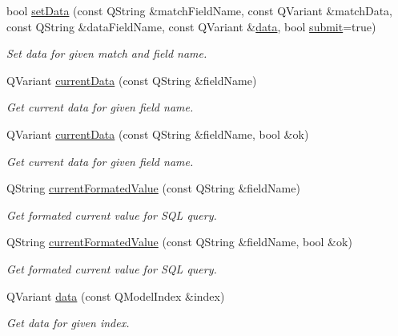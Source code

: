 \begin{DoxyCompactItemize}
bool \hyperlink{classmdt_abstract_sql_table_controller_a3e694e6dab9c883f1a276787a3723086}{set\-Data} (const Q\-String \&match\-Field\-Name, const Q\-Variant \&match\-Data, const Q\-String \&data\-Field\-Name, const Q\-Variant \&\hyperlink{classmdt_abstract_sql_table_controller_a1801a01c0ce073c2e389b20f58a3d3ff}{data}, bool \hyperlink{classmdt_abstract_sql_table_controller_a14f3e2a91fc30ca0e018944f4f95bc33}{submit}=true)
\begin{DoxyCompactList}\small\item\em Set data for given match and field name. \end{DoxyCompactList}\item 
Q\-Variant \hyperlink{classmdt_abstract_sql_table_controller_a055b69caef2670ea1ba6a5095167663f}{current\-Data} (const Q\-String \&field\-Name)
\begin{DoxyCompactList}\small\item\em Get current data for given field name. \end{DoxyCompactList}\item 
Q\-Variant \hyperlink{classmdt_abstract_sql_table_controller_a3477c9a155627cb08b660182a6ad6ff4}{current\-Data} (const Q\-String \&field\-Name, bool \&ok)
\begin{DoxyCompactList}\small\item\em Get current data for given field name. \end{DoxyCompactList}\item 
Q\-String \hyperlink{classmdt_abstract_sql_table_controller_a0af4c6d87f3d5b1ba7220c58e865dd1f}{current\-Formated\-Value} (const Q\-String \&field\-Name)
\begin{DoxyCompactList}\small\item\em Get formated current value for S\-Q\-L query. \end{DoxyCompactList}\item 
Q\-String \hyperlink{classmdt_abstract_sql_table_controller_a43311c27eab3a892fd079164abf3501f}{current\-Formated\-Value} (const Q\-String \&field\-Name, bool \&ok)
\begin{DoxyCompactList}\small\item\em Get formated current value for S\-Q\-L query. \end{DoxyCompactList}\item 
Q\-Variant \hyperlink{classmdt_abstract_sql_table_controller_a1801a01c0ce073c2e389b20f58a3d3ff}{data} (const Q\-Model\-Index \&index)
\begin{DoxyCompactList}\small\item\em Get data for given index. \end{DoxyCompactList}\item 

\end{DoxyCompactItemize}
